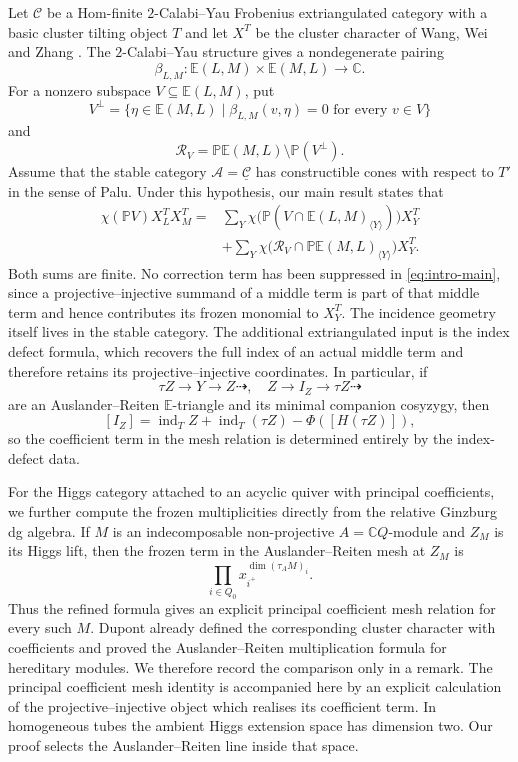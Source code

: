 \documentclass[11pt,reqno]{article}
\numberwithin{equation}{section}
\theoremstyle{definition}
\DeclareMathOperator{\ind}{ind}
\newcommand{\C}{\mathcal C}
\newcommand{\A}{\mathcal A}
\newcommand{\E}{\mathbb E}
\newcommand{\kk}{\mathbb C}
\begin{document}
Let $\C$ be a Hom-finite $2$-Calabi--Yau Frobenius extriangulated category with a basic cluster tilting object $T$ and let $X^T$ be the cluster character of Wang, Wei and Zhang \cite{WangWeiZhangCC}.  The $2$-Calabi--Yau structure gives a nondegenerate pairing
\[
 \beta_{L,M}\colon\E(L,M)\times\E(M,L)\longrightarrow\kk.
\]
For a nonzero subspace $V\subseteq\E(L,M)$, put
\[
 V^{\perp}=\{\eta\in\E(M,L)\mid \beta_{L,M}(v,\eta)=0
 \text{ for every }v\in V\}
\]
and
\[
 \mathcal R_V=\mathbb P\E(M,L)\setminus\mathbb P(V^{\perp}).
\]
Assume that the stable category $\A=\underline{\C}$ has constructible cones with respect to $T'$ in the sense of Palu.  Under this hypothesis, our main result states that
\begin{equation}\label{eq:intro-main}
\begin{aligned}
 \chi(\mathbb PV)X^T_{L}X^T_M
 ={}&\sum_Y\chi\bigl(\mathbb P(V\cap\E(L,M)_{\langle Y\rangle})\bigr)X^T_Y\\
 &+\sum_Y\chi\bigl(\mathcal R_V\cap
        \mathbb P\E(M,L)_{\langle Y\rangle}\bigr)X^T_Y.
\end{aligned}
\end{equation}
Both sums are finite.  No correction term has been suppressed in \eqref{eq:intro-main}, since a projective--injective summand of a middle term is part of that middle term and hence contributes its frozen monomial to $X^T_Y$.  The incidence geometry itself lives in the stable category. The additional extriangulated input is the index defect formula, which recovers the full index of an actual middle term and therefore retains its projective--injective coordinates.  In particular, if
\[
 \tau Z\longrightarrow Y\longrightarrow Z\dashrightarrow,
 \quad
 Z\longrightarrow I_Z\longrightarrow\tau Z\dashrightarrow
\]
are an Auslander--Reiten $\E$-triangle and its minimal companion cosyzygy, then
\[
 [I_Z]
 =\ind_T Z+\ind_T(\tau Z)-\Phi([H(\tau Z)]),
\]
so the coefficient term in the mesh relation is determined entirely by the index-defect data.

For the Higgs category attached to an acyclic quiver with principal coefficients, we further compute the frozen multiplicities directly from the relative Ginzburg dg algebra.  If $M$ is an indecomposable non-projective $A=\kk Q$-module and $Z_M$ is its Higgs lift, then the frozen term in the Auslander--Reiten mesh at $Z_M$ is
\[
 \prod_{i\in Q_0}x_{i^+}^{\dim(\tau_A M)_i}.
\]
Thus the refined formula gives an explicit principal coefficient mesh relation for every such $M$.  Dupont \cite[Definition~2.1 and Proposition~2.2]{DupontCoefficients} already defined the corresponding cluster character with coefficients and proved the Auslander--Reiten multiplication formula for hereditary modules. We therefore record the comparison only in a remark. The principal coefficient mesh identity is accompanied here by an explicit calculation of the projective--injective object which realises its coefficient term. In homogeneous tubes the ambient Higgs extension space has dimension two. Our proof selects the Auslander--Reiten line inside that space.
\end{document}
